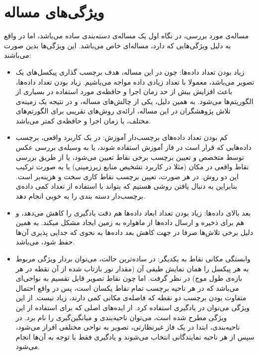 \documentclass[11pt]{article}
\begin{document}
\section[ویژگی‌های مساله]{
ویژگی‌های مساله
}
مساله‌ی مورد بررسی، در نگاه اول یک مساله‌ی دسته‌بندی ساده می‌باشد، اما در  واقع به دلیل ویژگی‌هایی که دارد، مساله‌ای خاص می‌باشد. این ویژگی‌‌ها بدین صورت می‌باشند:
\begin{itemize}
\item {زیاد بودن تعداد داده‌ها:}
چون در این مساله، هدف برچسب گذاری پیکسل‌های یک تصویر می‌باشد، معمولا با تعداد زیادی داده مواجه می‌باشیم. زیاد بودن تعداد داده‌ها، باعث افزایش بیش از حد زمان اجرا و حافظه‌ی مورد استفاده در بسیاری از الگوریتم‌ها می‌شود. به همین دلیل، یکی از چالش‌های مساله، و در نتیجه یک زمینه‌ی تلاش پژوهشگران در این مساله، ارائه‌ی روش‌های تقریبی برای الگورتم‌های مختلف، با زمان اجرا و حافظه‌ی کمتر می‌باشد.
\item {کم بودن تعداد داده‌های برچسب‌دار آموزش:}
در یک کاربرد واقعی، برچسب داده‌هایی که قرار است در فاز آموزش استفاده شوند، یا به وسیله‌ی بررسی عکس توسط متخصص و تعیین برچسب برخی نقاط تعیین می‌شود، یا از طریق بررسی نقاط واقعی در مکان (مثلا در کاربرد تشخیص منابع زیرزمینی) یا به صورت ترکیب این دو روش. در هر صورت، تعیین برچسب نقاط کاری سخت و هزینه‌بر است. بنابراین به دنبال یافتن روشی هستیم که بتواند با استفاده از تعداد کمی داده‌ی برچسب‌دار دسته بندی را به خوبی انجام دهد.
\item {بعد بالای داده‌ها:}
زیاد بودن تعداد ابعاد داده‌ها هم دقت یادگیری را کاهش می‌دهد، و هم برای ذخیره و ارسال داده‌ها از ماهواره به زمین ایجاد مشکل میکند. به همین دلیل برخی تلاش‌ها صرفا در جهت کاهش بعد داده‌ها به نحوی که جدایی پذیری آن‌ها حفظ شود، می‌باشد.
\item {وابستگی مکانی نقاط به یکدیگر:}
در ساده‌ترین حالت، می‌توان بردار ویژگی مربوط به هر پیکسل را همان نمایش طیفی آن (مقدار نور بازتاب شده از آن نقطه در هر بازه‌ی طول موج) در نظر گرفت. اما چون نقاط تصویر قابل تقسیم به نواحی‌ای می‌باشد که در هر ناحیه برچسب تمام نقاط یکسان است، پس در واقع احتمال متفاوت بودن برچسب دو نقطه که فاصله‌ی مکانی کمی دارند، زیاد نیست. از این ویژگی می‌توان در یادگیری استفاده کرد. از ایده‌های اصلی که برای استفاده از این ویژگی مطرح شده است، می‌توان ناحیه‌بندی و میانگین‌گیری را نام برد. در ناحیه‌بندی، ابتدا در یک فاز غیرنظارتی، تصویر به نواحی مختلفی افراز می‌شود، سپس از هر ناحیه نمایندگانی انتخاب می‌شوند و یادگیری فقط با توجه به آن‌ها انجام می‌شود.


\end{itemize}
\end{document}
